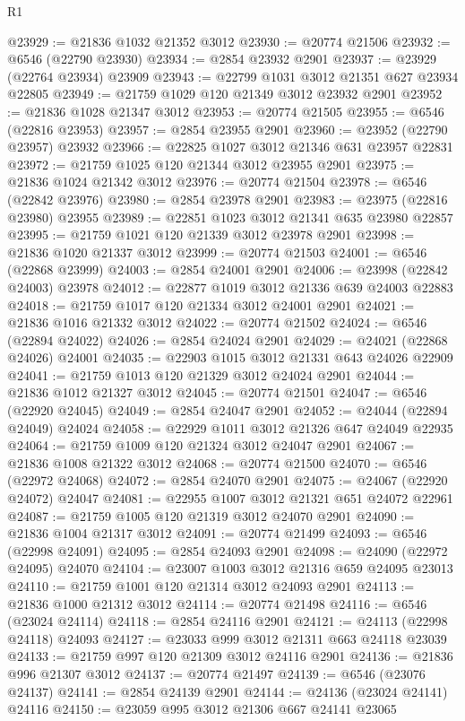 \begin{lexlean}{R1}
\begin{coremodule}
@23929 := @21836 @1032 @21352 @3012
@23930 := @20774 @21506
@23932 := @6546 (@22790 @23930)
@23934 := @2854 @23932 @2901
@23937 := @23929 (@22764 @23934) @23909
@23943 := @22799 @1031 @3012 @21351 @627 @23934 @22805
@23949 := @21759 @1029 @120 @21349 @3012 @23932 @2901
@23952 := @21836 @1028 @21347 @3012
@23953 := @20774 @21505
@23955 := @6546 (@22816 @23953)
@23957 := @2854 @23955 @2901
@23960 := @23952 (@22790 @23957) @23932
@23966 := @22825 @1027 @3012 @21346 @631 @23957 @22831
@23972 := @21759 @1025 @120 @21344 @3012 @23955 @2901
@23975 := @21836 @1024 @21342 @3012
@23976 := @20774 @21504
@23978 := @6546 (@22842 @23976)
@23980 := @2854 @23978 @2901
@23983 := @23975 (@22816 @23980) @23955
@23989 := @22851 @1023 @3012 @21341 @635 @23980 @22857
@23995 := @21759 @1021 @120 @21339 @3012 @23978 @2901
@23998 := @21836 @1020 @21337 @3012
@23999 := @20774 @21503
@24001 := @6546 (@22868 @23999)
@24003 := @2854 @24001 @2901
@24006 := @23998 (@22842 @24003) @23978
@24012 := @22877 @1019 @3012 @21336 @639 @24003 @22883
@24018 := @21759 @1017 @120 @21334 @3012 @24001 @2901
@24021 := @21836 @1016 @21332 @3012
@24022 := @20774 @21502
@24024 := @6546 (@22894 @24022)
@24026 := @2854 @24024 @2901
@24029 := @24021 (@22868 @24026) @24001
@24035 := @22903 @1015 @3012 @21331 @643 @24026 @22909
@24041 := @21759 @1013 @120 @21329 @3012 @24024 @2901
@24044 := @21836 @1012 @21327 @3012
@24045 := @20774 @21501
@24047 := @6546 (@22920 @24045)
@24049 := @2854 @24047 @2901
@24052 := @24044 (@22894 @24049) @24024
@24058 := @22929 @1011 @3012 @21326 @647 @24049 @22935
@24064 := @21759 @1009 @120 @21324 @3012 @24047 @2901
@24067 := @21836 @1008 @21322 @3012
@24068 := @20774 @21500
@24070 := @6546 (@22972 @24068)
@24072 := @2854 @24070 @2901
@24075 := @24067 (@22920 @24072) @24047
@24081 := @22955 @1007 @3012 @21321 @651 @24072 @22961
@24087 := @21759 @1005 @120 @21319 @3012 @24070 @2901
@24090 := @21836 @1004 @21317 @3012
@24091 := @20774 @21499
@24093 := @6546 (@22998 @24091)
@24095 := @2854 @24093 @2901
@24098 := @24090 (@22972 @24095) @24070
@24104 := @23007 @1003 @3012 @21316 @659 @24095 @23013
@24110 := @21759 @1001 @120 @21314 @3012 @24093 @2901
@24113 := @21836 @1000 @21312 @3012
@24114 := @20774 @21498
@24116 := @6546 (@23024 @24114)
@24118 := @2854 @24116 @2901
@24121 := @24113 (@22998 @24118) @24093
@24127 := @23033 @999 @3012 @21311 @663 @24118 @23039
@24133 := @21759 @997 @120 @21309 @3012 @24116 @2901
@24136 := @21836 @996 @21307 @3012
@24137 := @20774 @21497
@24139 := @6546 (@23076 @24137)
@24141 := @2854 @24139 @2901
@24144 := @24136 (@23024 @24141) @24116
@24150 := @23059 @995 @3012 @21306 @667 @24141 @23065

\end{coremodule}
\end{lexlean}
